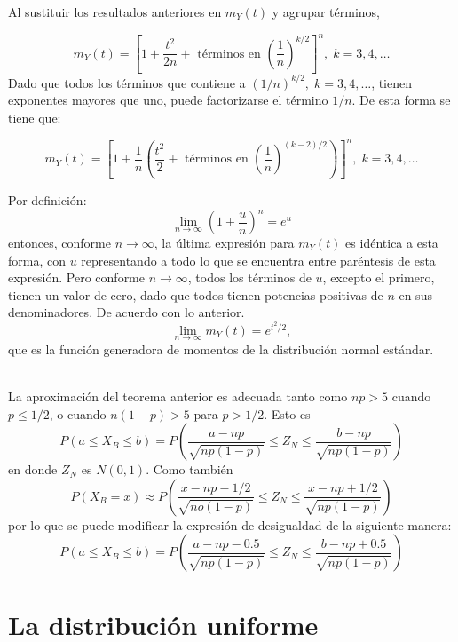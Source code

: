 \begin{teo}
	Al sustituir los resultados anteriores en $m_Y(t)$ y agrupar términos,

	$$m_Y(t)=\left[1+\dfrac{t^2}{2n}+\mbox{ términos en }\left(\dfrac{1}{n}\right)^{k/2}\right]^n,\; k=3,4,\ldots$$
	Dado que todos los términos que contiene a $(1/n)^{k/2},\; k=3,4,\ldots$, tienen exponentes mayores que uno, puede factorizarse el término $1/n$. De esta forma se tiene que:

	$$m_Y(t)=\left[1+\dfrac{1}{n} \left(\dfrac{t^2}{2}+\mbox{ términos en }\left(\dfrac{1}{n}\right)^{(k-2)/2}\right)\right]^n,\; k=3,4,\ldots$$

	Por definición:
	$$\lim_{n\to \infty}\left(1+\dfrac{u}{n}\right)^n=e^u$$
	entonces, conforme $n\to \infty$, la última expresión para $m_Y(t)$ es idéntica a esta forma, con $u$ representando a todo lo que se encuentra entre paréntesis de esta expresión. Pero conforme $n\to \infty$, todos los términos de $u$, excepto el primero, tienen un valor de cero, dado que todos tienen potencias positivas de $n$ en sus denominadores. De acuerdo con lo anterior.
	$$\lim_{n\to \infty}m_Y(t)=e^{t^2/2},$$
	que es la función generadora de momentos de la distribución normal estándar.\\\\

\end{teo}

La aproximación del teorema anterior es adecuada tanto como $np>5$ cuando $p\leq 1/2$, o cuando $n(1-p)>5$ para $p>1/2$. Esto es
$$P(a\leq X_B \leq b) = P\left(\dfrac{a-np}{\sqrt{np(1-p)}}\leq Z_N\leq \dfrac{b-np}{\sqrt{np(1-p)}}\right)$$
en donde $Z_N$ es $N(0,1)$. Como también
$$P(X_B=x)\approx P\left(\dfrac{x-np-1/2}{\sqrt{no(1-p)}}\leq Z_N\leq \dfrac{x-np+1/2}{\sqrt{np(1-p)}}\right)$$
por lo que se puede modificar la expresión de desigualdad de la siguiente manera:
$$P(a\leq X_B \leq b) = P\left(\dfrac{a-np-0.5}{\sqrt{np(1-p)}}\leq Z_N\leq \dfrac{b-np+0.5}{\sqrt{np(1-p)}}\right)$$


\section{La distribución uniforme}
